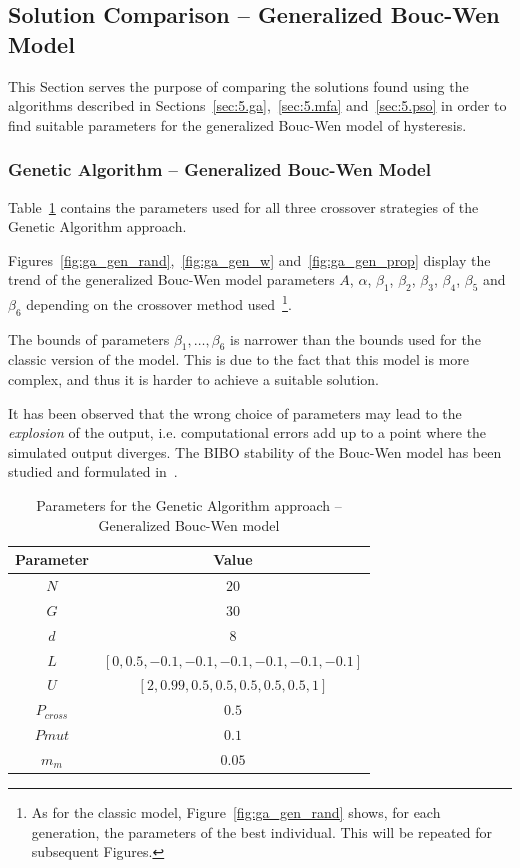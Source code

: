 \clearpage

\subsection{Solution Comparison -- Generalized Bouc-Wen Model}
\label{sec:5.comp_res_gen}

This Section serves the purpose of comparing the solutions found using the algorithms
described in Sections~\ref{sec:5.ga},~\ref{sec:5.mfa} and~\ref{sec:5.pso}
in order to find suitable parameters for the generalized Bouc-Wen model of hysteresis.

\subsubsection{Genetic Algorithm -- Generalized Bouc-Wen Model}

Table~\ref{tab:ga_gen_params} contains the parameters
used for all three crossover strategies of the Genetic Algorithm approach.

Figures~\ref{fig:ga_gen_rand},~\ref{fig:ga_gen_w} and~\ref{fig:ga_gen_prop}
display the trend of the generalized Bouc-Wen model parameters
$A$, $\alpha$, $\beta_1$, $\beta_2$, $\beta_3$, $\beta_4$, $\beta_5$ and $\beta_6$
depending on the crossover method used~\footnote{
As for the classic model, Figure~\ref{fig:ga_gen_rand} shows, for each generation,
the parameters of the best individual. This will be repeated for subsequent Figures.
}.

The bounds of parameters $\beta_1,\dots,\beta_6$ is narrower than
the bounds used for the classic version of the model. This is due to the fact
that this model is more complex, and thus it is harder to achieve a suitable solution.

It has been observed that the wrong choice of parameters may lead to the
\emph{explosion} of the output, i.e. computational errors add up to a point
where the simulated output diverges. The BIBO stability of the Bouc-Wen
model has been studied and formulated in~\cite{ikhouane2007dynamic}.

\begin{table}[H]
	\centering
	\begin{tabular}{c c}
		\toprule
		\textbf{Parameter} & \textbf{Value} \\ \toprule
		$N$			& $20$ \\
		$G$			& $30$ \\
		$d$			& $8$  \\
		$L$			& $\left[0, 0.5, -0.1, -0.1, -0.1, -0.1, -0.1, -0.1	\right]$ \\
		$U$			& $\left[2, 0.99, 0.5, 0.5, 0.5, 0.5, 0.5, 1			\right]$ \\ 
		$P_{cross}$	& $0.5$ \\
		$P{mut}$	& $0.1$ \\
		$m_m$		& $0.05$ \\	\bottomrule
	\end{tabular}
	\caption{Parameters for the Genetic Algorithm approach -- Generalized Bouc-Wen model}
	\label{tab:ga_gen_params}
\end{table}


